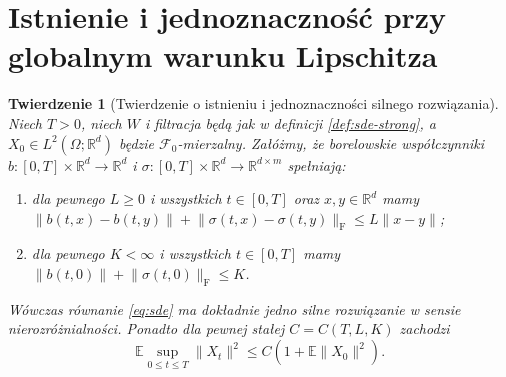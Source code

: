 \documentclass[11pt,a4paper,oneside]{report}
\numberwithin{equation}{chapter}
\theoremstyle{plain}
\newtheorem{twierdzenie}{Twierdzenie}[chapter]
\theoremstyle{definition}
\theoremstyle{remark}
\newcommand{\R}{\mathbb{R}}
\newcommand{\E}{\mathbb{E}}
\newcommand{\calF}{\mathcal{F}}
\newcommand{\norm}[1]{\lVert #1\rVert}
\begin{document}
\section{Istnienie i jednoznaczność przy globalnym warunku Lipschitza}\label{sec:volIII:05:04}
\begin{twierdzenie}[Twierdzenie o istnieniu i jednoznaczności silnego rozwiązania]\label{thm:volIII:05:01}
\label{th:sde-global}
Niech $T>0$, niech $W$ i filtracja będą jak w definicji
\ref{def:sde-strong}, a $X_0\in L^2(\Omega;\R^d)$ będzie
$\calF_0$-mierzalny. Załóżmy, że borelowskie współczynniki
$b:[0,T]\times\R^d\to\R^d$ i
$\sigma:[0,T]\times\R^d\to\R^{d\times m}$ spełniają:
\begin{enumerate}[label=(\roman*)]
\item dla pewnego $L\ge0$ i wszystkich $t\in[0,T]$ oraz
$x,y\in\R^d$ mamy
$\norm{b(t,x)-b(t,y)}+\norm{\sigma(t,x)-\sigma(t,y)}_{\mathrm F}
\le L\norm{x-y}$;
\item dla pewnego $K<\infty$ i wszystkich $t\in[0,T]$
mamy $\norm{b(t,0)}+\norm{\sigma(t,0)}_{\mathrm F}\le K$.
\end{enumerate}
Wówczas równanie \eqref{eq:sde} ma dokładnie jedno silne
rozwiązanie w sensie nierozróżnialności. Ponadto dla pewnej
stałej $C=C(T,L,K)$ zachodzi
\[
\E\sup_{0\le t\le T}\norm{X_t}^2
\le C(1+\E\norm{X_0}^2).
\tag{5.3}\label{eq:sde-moment}
\]
\end{twierdzenie}
\end{document}
